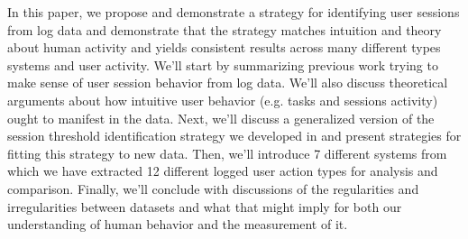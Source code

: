 In this paper, we propose and demonstrate a strategy for identifying user sessions from log data and demonstrate that the strategy matches intuition and theory about human activity and yields consistent results across many different types systems and user activity.  We'll start by summarizing previous work trying to make sense of user session behavior from log data.  We'll also discuss theoretical arguments about how intuitive user behavior (e.g. tasks and sessions activity) ought to manifest in the data.  Next, we'll discuss a generalized version of the session threshold identification strategy we developed in \cite{geiger13using} and present strategies for fitting this strategy to new data.  Then, we'll introduce 7 different systems from which we have extracted 12 different logged user action types for analysis and comparison. Finally, we'll conclude with discussions of the regularities and irregularities between datasets and what that might imply for both our understanding of human behavior and the measurement of it.
